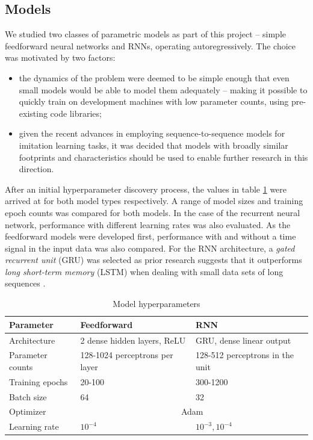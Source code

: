 \documentclass{article}
\begin{document}
\subsection{Models}
\label{sec:models}

We studied two classes of parametric models as part of this project -- simple feedforward neural networks and RNNs, operating autoregressively. The choice was motivated by two factors:
\begin{itemize}
	\item the dynamics of the problem were deemed to be simple enough that even small models would be able to model them adequately -- making it possible to quickly train on development machines with low parameter counts, using pre-existing code libraries;
	\item given the recent advances in employing sequence-to-sequence models for imitation learning tasks, it was decided that models with broadly similar footprints and characteristics should be used to enable further research in this direction.
\end{itemize}

After an initial hyperparameter discovery process, the values in table \ref{tab:table1} were arrived at for both model types respectively. A range of model sizes and training epoch counts was compared for both models. In the case of the recurrent neural network, performance with different learning rates was also evaluated. As the feedforward models were developed first, performance with and without a time signal in the input data was also compared. For the RNN architecture, a \emph{gated recurrent unit} (GRU) was selected as prior research suggests that it outperforms \emph{long short-term memory} (LSTM) when dealing with small data sets of long sequences \citep{yang2020lstm}.

\begin{table}
	\caption{Model hyperparameters}
	\centering
	\begin{tabular}{lll}
		\toprule
		Parameter & Feedforward & RNN \\
		\midrule
		Architecture & 2 dense hidden layers, ReLU  & GRU, dense linear output   \\
		Parameter counts     & 128-1024 perceptrons per layer & 128-512 perceptrons in the unit \\
		Training epochs     & 20-100       & 300-1200  \\
		Batch size    & 64       & 32  \\
		Optimizer    & \multicolumn{2}{c}{Adam}  \\
		Learning rate    & $10^{-4}$       & $10^{-3}, 10^{-4}$   \\
		\bottomrule
	\end{tabular}
	\label{tab:table1}
\end{table}
\end{document}
